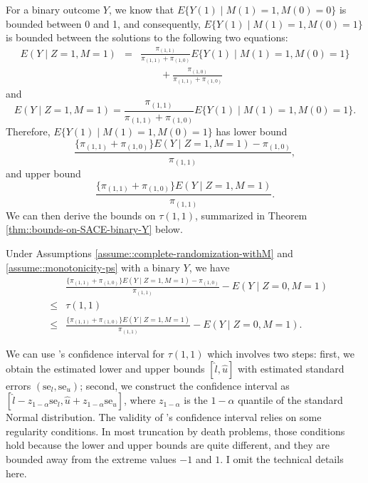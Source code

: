 For a binary outcome $Y$, we know that $E\{  Y(1)\mid  M(1)=1, M(0)=0 \}$ is bounded between 0 and 1, and consequently, $E\{  Y(1)\mid   M(1)=1, M(0)=1 \}$ is bounded between the solutions to the following two equations:
\begin{eqnarray*}
E(Y\mid Z=1,M=1) &=& \frac{ \pi_{(1,1)}}{ \pi_{(1,1)} + \pi_{(1,0)}} E\{  Y(1)\mid   M(1)=1, M(0)=1 \}  \\
&&\qquad + \frac{ \pi_{(1,0)}}{ \pi_{(1,1)} + \pi_{(1,0)}}  
\end{eqnarray*}
and
$$
E(Y\mid Z=1,M=1) = \frac{ \pi_{(1,1)}}{ \pi_{(1,1)} + \pi_{(1,0)}} E\{  Y(1)\mid   M(1)=1, M(0)=1 \} .
$$
Therefore,  $E\{  Y(1)\mid   M(1)=1, M(0)=1 \}$ has lower bound
$$
\frac{  \{  \pi_{(1,1)} + \pi_{(1,0)} \} E(Y\mid Z=1,M=1) - \pi_{(1,0)}}{ \pi_{(1,1)}},
$$
and upper bound
$$
\frac{  \{  \pi_{(1,1)} + \pi_{(1,0)} \} E(Y\mid Z=1,M=1)  }{ \pi_{(1,1)}} . 
$$
We can then derive the bounds on $\tau(1,1)$, summarized in Theorem \ref{thm::bounds-on-SACE-binary-Y} below.



\begin{theorem}
\label{thm::bounds-on-SACE-binary-Y}
Under Assumptions \ref{assume::complete-randomization-withM} and \ref{assume::monotonicity-ps} with a binary $Y$, we have
\begin{eqnarray*}
&&\frac{  \{  \pi_{(1,1)} + \pi_{(1,0)} \} E(Y\mid Z=1,M=1) - \pi_{(1,0)}}{ \pi_{(1,1)}} - E(Y\mid Z=0, M=1) \\
&\leq & \tau(1,1) \\
& \leq &\frac{  \{  \pi_{(1,1)} + \pi_{(1,0)} \} E(Y\mid Z=1,M=1)  }{ \pi_{(1,1)}}  - E(Y\mid Z=0, M=1). 
\end{eqnarray*}
\end{theorem}




We can use \citet{imbens2004confidence}'s confidence interval for $\tau(1,1)$ which involves two steps: first, we obtain the estimated lower and upper bounds $[\hat{l}, \hat{u}]$ with estimated standard errors $(\text{se}_l, \text{se}_u)$; second, we construct the confidence interval as $[ \hat{l} - z_{1-\alpha}  \text{se}_l, \hat{u} + z_{1-\alpha}    \text{se}_u]$, where $z_{1-\alpha} $ is the $1-\alpha$ quantile of the standard Normal distribution. The validity of \citet{imbens2004confidence}'s confidence interval relies on some regularity conditions. In most truncation by death problems, those conditions hold because the lower and upper bounds are quite different, and they are bounded away from the extreme values $-1$ and $1$. I omit the technical details here. 



